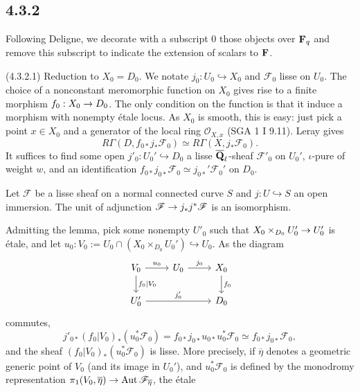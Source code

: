 \documentclass[deligne.tex]{subfiles}
\begin{document}
\subsection*{4.3.2}\label{laumon:4.3.2}
Following Deligne, we decorate with a subscript 0
those objects over $\mathbf{F}_q$ and remove this subscript to indicate the
extension of scalars to $\mathbf{F}$.

(4.3.2.1) Reduction to $X_0=D_0$. We notate $j_0:U_0\hookrightarrow X_0$ 
and $\mathscr F_0$ lisse on $U_0$.
The choice of a nonconstant meromorphic function on $X_0$ gives rise to a
finite morphism $f_0:X_0\rightarrow D_0$.
The only condition on the function is that it induce a morphism with 
nonempty étale locus. As $X_0$ is smooth, this is easy: just pick a point
$x\in X_0$ and a generator of the local ring $\mathscr O_{X,x}$
(SGA 1 I 9.11). Leray gives
\begin{equation*}
	R\Gamma(D,f_{0*}j_*\mathscr F_0)\simeq R\Gamma(X,j_*\mathscr F_0).
\end{equation*}
It suffices to find some open $j'_0:U_0'\hookrightarrow D_0$ a lisse
$\overline{\mathbf{Q}}_\ell$-sheaf $\mathscr F'_0$ on $U_0'$, $\iota$-pure of weight 
$w$, and an identification
$f_{0*}j_{0*}\mathscr F_0\simeq j_{0*}'\mathscr F_0'$ on $D_0$.
\begin{lemma*}
	Let $\mathscr F$ be a lisse sheaf on a normal connected curve $S$ and
	$j:U\hookrightarrow S$ an open immersion.
	The unit of adjunction $\mathscr F\rightarrow j_*j^*\mathscr F$ is an 
	isomorphism.
\end{lemma*}
Admitting the lemma, pick some nonempty $U'_0$ such that
$X_0\times_{D_0}U_0'\rightarrow U_0'$ is étale, and let
$u_0:V_0:=U_0\cap(X_0\times_{D_0}U_0')\hookrightarrow U_0$.
As the diagram
\begin{equation*}\begin{tikzcd}
	V_0\arrow[r,"u_0"]\arrow[d,"f_0|V_0"]
	&U_0\arrow[r,"j_0"]&X_0\arrow[d,"f_0"] \\
	U_0'\arrow[rr,"j_0'"]&&D_0
\end{tikzcd}\end{equation*}
commutes,
\begin{equation*}
	j'_{0*}(f_0|V_0)_*(u_0^*\mathscr F_0)
	=f_{0*}j_{0*}u_{0*}u_0^*\mathscr F_0
	\simeq f_{0*}j_{0*}\mathscr F_0,
\end{equation*}
and the sheaf $(f_0|V_0)_*(u_0^*\mathscr F_0)$ is lisse. More precisely,
if $\overline\eta$ denotes a geometric generic point of $V_0$
(and its image in $U_0'$), and $u_0^*\mathscr F_0$ is defined by the 
monodromy representation
$\pi_1(V_0,\overline\eta)\rightarrow\operatorname{Aut}\mathscr F_{\overline\eta}$, the étale
\end{document}
